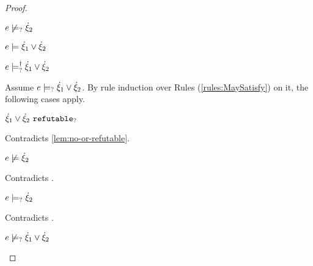 \begin{proof}
\begin{byCases}
\begin{byCases}
\begin{pfsteps*}
        \item $e \not\models_{?} \dot{\xi}_2$  
        \item $e \models \dot{\xi}_1 \vee \dot{\xi}_2$  
        \item $e \models_{?}^{\dag} \dot{\xi}_1 \vee \dot{\xi}_2$ 
        \end{pfsteps*}
        Assume $e \models_{?} \dot{\xi}_1 \vee \dot{\xi}_2$. By rule induction over Rules (\ref{rules:MaySatisfy}) on it, the following cases apply.
        \begin{byCases}
        \item[\text{(\ref{rule:CMSNotIntro})}]
            \begin{pfsteps*}
            \item $\dot{\xi}_1 \vee \dot{\xi}_2 ~\mathtt{refutable}_?$ 
            \end{pfsteps*}
            Contradicts \autoref{lem:no-or-refutable}.
        \item[\text{(\ref{rule:CMSOr1})}]
            \begin{pfsteps*}
            \item $e \not\models \dot{\xi}_2$ 
            \end{pfsteps*}
            Contradicts .
        \item[\text{(\ref{rule:CMSOr2})}]
            \begin{pfsteps*}
            \item $e \models_{?} \dot{\xi}_2$ 
            \end{pfsteps*}
            Contradicts .
        \end{byCases}
        \begin{pfsteps*}
        \item $e \not\models_{?} \dot{\xi}_1 \vee \dot{\xi}_2$ 
        \end{pfsteps*}
        

\end{byCases}
\end{byCases}
\end{proof}
